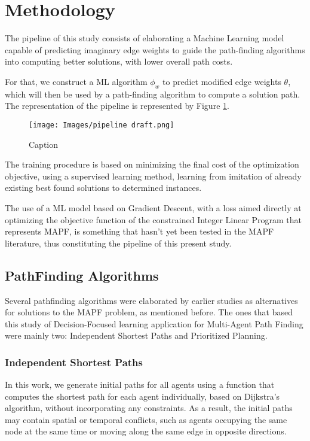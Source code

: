 \section{Methodology}

The pipeline of this study consists of elaborating a Machine Learning model capable of predicting imaginary edge weights to guide the path-finding algorithms into computing better solutions, with lower overall path costs.

For that, we construct a ML algorithm $\phi_w$ to predict modified edge weights $\theta$, which will then be used by a path-finding algorithm to compute a solution path. The representation of the pipeline is represented by Figure \ref{fig:pipeline-draft}.

\begin{figure}
    \centering
    \texttt{[image: Images/pipeline draft.png]}
    \caption{Caption}
    \label{fig:pipeline-draft}
\end{figure}

The training procedure is based on minimizing the final cost of the optimization objective, using a supervised learning method, learning from imitation of already existing best found solutions to determined instances.

The use of a ML model based on Gradient Descent, with a loss aimed directly at optimizing the objective function of the constrained Integer Linear Program that represents MAPF, is something that hasn't yet been tested in the MAPF literature, thus constituting the pipeline of this present study.

\subsection{PathFinding Algorithms}
Several pathfinding algorithms were elaborated by earlier studies as alternatives for solutions to the MAPF problem, as mentioned before. The ones that based this study of Decision-Focused learning application for Multi-Agent Path Finding were mainly two: Independent Shortest Paths and Prioritized Planning.

\subsubsection{Independent Shortest Paths}
In this work, we generate initial paths for all agents using a function that computes the shortest path for each agent individually, based on Dijkstra’s algorithm, without incorporating any constraints. As a result, the initial paths may contain spatial or temporal conflicts, such as agents occupying the same node at the same time or moving along the same edge in opposite directions.

